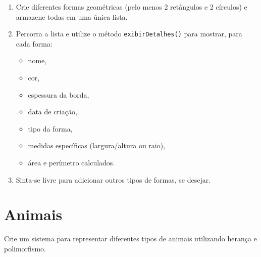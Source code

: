 \documentclass{article}
\begin{document}
\begin{enumerate}
    \item Crie diferentes formas geométricas (pelo menos 2 retângulos e 2 círculos) 
    e armazene todas em uma única lista.

    \item Percorra a lista e utilize o método \texttt{exibirDetalhes()} para mostrar, para cada forma:
    \begin{itemize}
        \item nome,
        \item cor,
        \item espessura da borda,
        \item data de criação,
        \item tipo da forma,
        \item medidas específicas (largura/altura ou raio),
        \item área e perímetro calculados.
    \end{itemize}

    \item Sinta-se livre para adicionar outros tipos de formas, se desejar.
\end{enumerate}

\section{Animais}

Crie um sistema para representar diferentes tipos de animais utilizando herança e polimorfismo.
\end{document}
